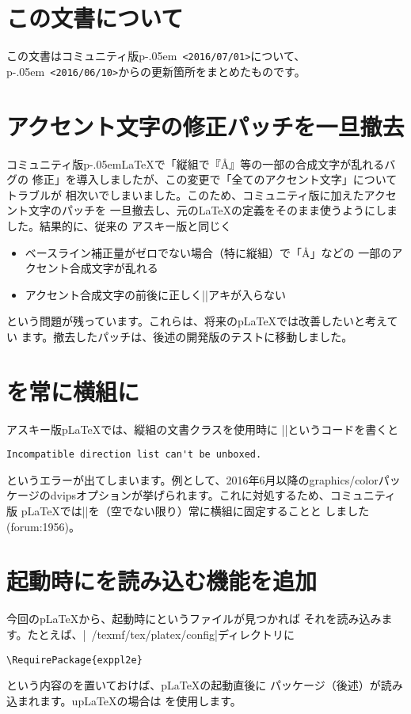 \documentclass{plnews}
\author{日本語\TeX{}開発コミュニティ（\texttt{https://texjp.org/}）}
\def\pLaTeX{p\kern-.05em\LaTeX}
\def\pLaTeXe{p\kern-.05em\LaTeXe}
\begin{document}
\maketitle

\section{この文書について}
この文書はコミュニティ版\pLaTeXe\ \texttt{<2016/07/01>}について、
\pLaTeXe\ \texttt{<2016/06/10>}からの更新箇所をまとめたものです。


\section{アクセント文字の修正パッチを一旦撤去}
コミュニティ版\pLaTeX{}で「縦組で『\AA{}』等の一部の合成文字が乱れるバグの
修正」を導入しましたが、この変更で「全てのアクセント文字」についてトラブルが
相次いでしまいました。このため、コミュニティ版に加えたアクセント文字のパッチを
一旦撤去し、元の\LaTeX{}の定義をそのまま使うようにしました。結果的に、従来の
アスキー版と同じく
\begin{itemize}
\item ベースライン補正量がゼロでない場合（特に縦組）で「\AA」などの
一部のアクセント合成文字が乱れる
\item アクセント合成文字の前後に正しく|\xkanjiskip|アキが入らない
\end{itemize}
という問題が残っています。これらは、将来のp\LaTeX{}では改善したいと考えてい
ます。撤去したパッチは、後述の開発版のテストに移動しました。


\section{\texttt{\string\@begindvibox}を常に横組に}
アスキー版p\LaTeX{}では、縦組の文書クラスを使用時に
|\AtBeginDocument{\AtBeginDvi{}}|というコードを書くと
\begin{verbatim}
Incompatible direction list can't be unboxed.
\end{verbatim}
というエラーが出てしまいます。例として、2016年6月以降のgraphics/colorパッ
ケージのdvipsオプションが挙げられます。これに対処するため、コミュニティ版
p\LaTeX{}では|\@begindvibox|を（空でない限り）常に横組に固定することと
しました(forum:1956)。


\section{起動時にを読み込む機能を追加}
今回のp\LaTeX{}から、起動時にというファイルが見つかれば
それを読み込みます。たとえば、|~/texmf/tex/platex/config|ディレクトリに
\begin{verbatim}
\RequirePackage{exppl2e}
\end{verbatim}
という内容のを置いておけば、p\LaTeX{}の起動直後に
パッケージ（後述）が読み込まれます。up\LaTeX{}の場合は
を使用します。
\end{document}
